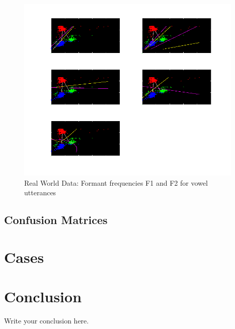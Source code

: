 \documentclass[11pt,a4paper]{article}
\begin{document}
\begin{figure}[H]
	\includegraphics[height=9cm]{Figures/RWD_DB.png}
	\caption{Real World Data: Formant frequencies F1 and F2 for vowel utterances}
\end{figure}


\subsection{Confusion Matrices}

\section{Cases}

\section{Conclusion}
Write your conclusion here.
\end{document}
